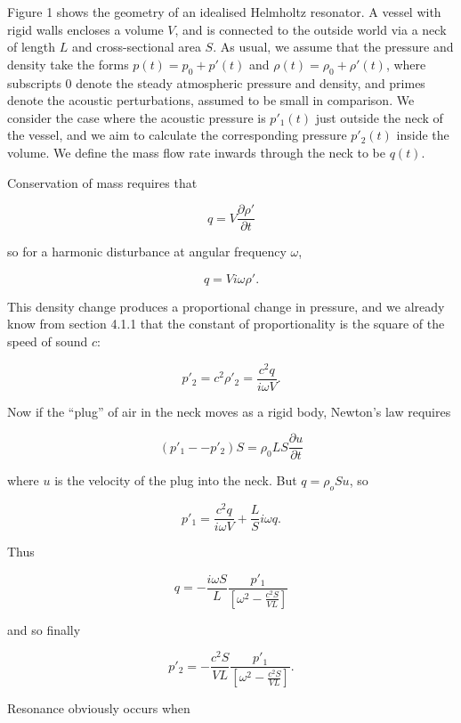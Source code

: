  Figure 1 shows the geometry of an idealised Helmholtz resonator. A vessel 
  with rigid walls encloses a volume $V$, and is connected to the outside world 
  via a neck of length $L$ and cross-sectional area $S$. As usual, we assume 
  that the pressure and density take the forms $p(t)=p_0+p'(t)$ and 
  $\rho(t)=\rho_0+\rho'(t)$, where subscripts 0 denote the steady atmospheric 
  pressure and density, and primes denote the acoustic perturbations, assumed 
  to be small in comparison. We consider the case where the acoustic pressure 
  is $p'_1(t)$ just outside the neck of the vessel, and we aim to calculate the 
  corresponding pressure $p'_2(t)$ inside the volume. We define the mass flow 
  rate inwards through the neck to be $q(t)$. 


  Conservation of mass requires that 

  $$q=V\dfrac{\partial \rho'}{\partial t} \tag{1}$$ 

  so for a harmonic disturbance at angular frequency $\omega$, 

  $$q=V i \omega \rho' . \tag{2}$$ 

  This density change produces a proportional change in pressure, and we 
  already know from section 4.1.1 that the constant of proportionality is the 
  square of the speed of sound $c$: 

  $$p'_2=c^2 \rho'_2 = \dfrac{c^2 q}{i \omega V} . \tag{3}$$ 

  Now if the ``plug'' of air in the neck moves as a rigid body, Newton's law 
  requires 

  $$\left( p'_1 -- p'_2 \right) S = \rho_0 L S \dfrac{\partial u}{\partial t} 
  \tag{4}$$ 

  where $u$ is the velocity of the plug into the neck. But $q=\rho_o S u$, so 

  $$p'_1 = \dfrac{c^2 q}{i \omega V} + \dfrac{L}{S} i \omega q . \tag{5}$$ 

  Thus 

  $$q= -\dfrac{i \omega S}{L} \dfrac{p'_1}{\left[\omega^2 -\frac{c^2 
  S}{VL}\right]} \tag{6}$$ 

  and so finally 

  $$p'_2= -\dfrac{c^2 S}{VL} \dfrac{p'_1}{\left[\omega^2 -\frac{c^2 
  S}{VL}\right]} . \tag{7}$$ 

  Resonance obviously occurs when 

